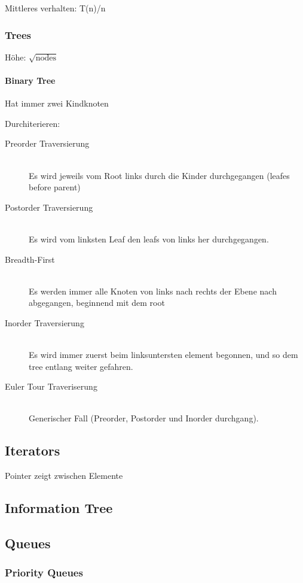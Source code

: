 Mittleres verhalten: T(n)/n


\subsubsection{Trees}

Höhe: $\sqrt{\text{nodes}}$


\paragraph{Binary Tree}

Hat immer zwei Kindknoten

Durchiterieren:
\begin{description}
	\item[Preorder Traversierung] \hfill \\
		Es wird jeweils vom Root links durch die Kinder durchgegangen (leafes before parent)
	\item[Postorder Traversierung] \hfill \\
		Es wird vom linksten Leaf den leafs von links her durchgegangen.
	\item[Breadth-First]\hfill \\
		Es werden immer alle Knoten von links nach rechts der Ebene nach abgegangen, beginnend mit dem root
	\item[Inorder Traversierung] \hfill \\
		Es wird immer zuerst beim linksuntersten element begonnen, und so dem tree entlang weiter gefahren.
	\item[Euler Tour Traveriserung] \hfill \\
		Generischer Fall (Preorder, Postorder und Inorder durchgang).
\end{description}

\subsection{Iterators}

Pointer zeigt zwischen Elemente

\subsection{Information Tree}


\subsection{Queues}

\subsubsection{Priority Queues}

